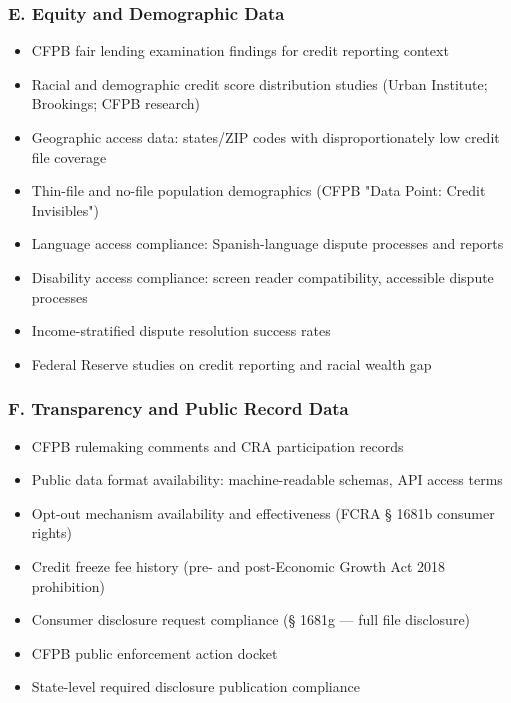 \documentclass[a4paper,11pt]{article}
\begin{document}
	\subsubsection{E. Equity and Demographic Data}
	
	\begin{itemize}[leftmargin=1.5em]
		\item CFPB fair lending examination findings for credit reporting context
		\item Racial and demographic credit score distribution studies (Urban Institute; Brookings; CFPB research)
		\item Geographic access data: states/ZIP codes with disproportionately low credit file coverage
		\item Thin-file and no-file population demographics (CFPB "Data Point: Credit Invisibles")
		\item Language access compliance: Spanish-language dispute processes and reports
		\item Disability access compliance: screen reader compatibility, accessible dispute processes
		\item Income-stratified dispute resolution success rates
		\item Federal Reserve studies on credit reporting and racial wealth gap
	\end{itemize}
	
	\subsubsection{F. Transparency and Public Record Data}
	
	\begin{itemize}[leftmargin=1.5em]
		\item CFPB rulemaking comments and CRA participation records
		\item Public data format availability: machine-readable schemas, API access terms
		\item Opt-out mechanism availability and effectiveness (FCRA § 1681b consumer rights)
		\item Credit freeze fee history (pre- and post-Economic Growth Act 2018 prohibition)
		\item Consumer disclosure request compliance (§ 1681g — full file disclosure)
		\item CFPB public enforcement action docket
		\item State-level required disclosure publication compliance
	\end{itemize}
	
\end{document}
